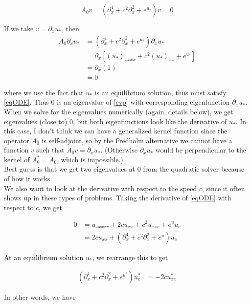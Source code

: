 \documentclass[12pt]{article}
\begin{document}
\begin{equation*}
A_0 v = (\partial_x^4 + c^2 \partial_x^2 + e^{u_*})v = 0
\end{equation*}

If we take $v = \partial_x u_*$, then 
\begin{align*}
A_0 \partial_x u_* &= 
(\partial_x^4 + c^2 \partial_x^2 + e^{u_*})\partial_x u_* \\
&= \partial_x[(u_*)_{xxxx} + c^2 (u_*)_{xx} + e^{u_*}] \\
&= \partial_x(1) \\
&= 0
\end{align*}

where we use the fact that $u_*$ is an equilibrium solution, thus must satisfy \eqref{eqODE}. Thus 0 is an eigenvalue of \eqref{evp} with corresponding eigenfunction $\partial_x u_*$.\\

When we solve for the eigenvalues numerically (again, details below), we get eigenvalues (close to) 0, but both eigenfunctions look like the derivative of $u_*$. In this case, I don't think we can have a generalized kernel function since the operator $A_0$ is self-adjoint, so by the Fredholm alternative we cannot have a function $v$ such that $A_0 v = \partial_x u_*$. (Otherwise $\partial_x u_*$ would be perpendicular to the kernel of $A_0^* = A_0$, which is impossible.)\\

Best guess is that we get two eigenvalues at 0 from the quadratic solver because of how it works.\\

We also want to look at the derivative with respect to the speed $c$, since it often shows up in these types of problems. Taking the derivative of \eqref{eqODE} with respect to $c$, we get

\begin{align*}
0 &= u_{xxxxc} + 2 c u_{xx} + c^2 u_{xxc} + e^{u} u_c \\
&= 2 c u_{xx} + (\partial_x^4 + c^2 \partial_x^2 + e^{u})u_c
\end{align*}

At an equilibrium solution $u_*$, we rearrange this to get

\begin{align*}
(\partial_x^4 + c^2 \partial_x^2 + e^{u^*})u^*_c &= -2 c u^*_{xx}
\end{align*}

In other words, we have
\end{document}
